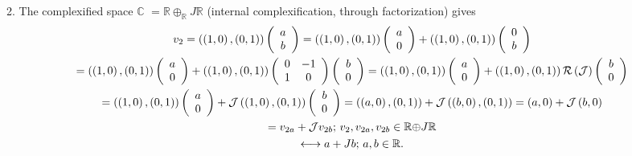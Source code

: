 \documentclass[aps,preprint]{revtex4}
\begin{document}
2. The complexified space $\mathbb{C}$ $=\mathbb{R}\oplus _{\mathbb{R}}J%
\mathbb{R}$ (internal complexification, through factorization) gives%
\begin{gather}
v_{2}=\left( \left( 1,0\right) ,\left( 0,1\right) \right) \left( 
\begin{array}{c}
a \\ 
b%
\end{array}%
\right) =\left( \left( 1,0\right) ,\left( 0,1\right) \right) \left( 
\begin{array}{c}
a \\ 
0%
\end{array}%
\right) +\left( \left( 1,0\right) ,\left( 0,1\right) \right) \left( 
\begin{array}{c}
0 \\ 
b%
\end{array}%
\right) \\
=\left( \left( 1,0\right) ,\left( 0,1\right) \right) \left( 
\begin{array}{c}
a \\ 
0%
\end{array}%
\right) +\left( \left( 1,0\right) ,\left( 0,1\right) \right) \left( 
\begin{array}{cc}
0 & -1 \\ 
1 & 0%
\end{array}%
\right) \left( 
\begin{array}{c}
b \\ 
0%
\end{array}%
\right) =\left( \left( 1,0\right) ,\left( 0,1\right) \right) \left( 
\begin{array}{c}
a \\ 
0%
\end{array}%
\right) +\left( \left( 1,0\right) ,\left( 0,1\right) \right) \mathcal{R}%
\left( \mathcal{J}\right) \left( 
\begin{array}{c}
b \\ 
0%
\end{array}%
\right) \\
=\left( \left( 1,0\right) ,\left( 0,1\right) \right) \left( 
\begin{array}{c}
a \\ 
0%
\end{array}%
\right) +\mathcal{J}\left( \left( 1,0\right) ,\left( 0,1\right) \right)
\left( 
\begin{array}{c}
b \\ 
0%
\end{array}%
\right) =\left( \left( a,0\right) ,\left( 0,1\right) \right) +\mathcal{J}%
\left( \left( b,0\right) ,\left( 0,1\right) \right) =\left( a,0\right) +%
\mathcal{J}\left( b,0\right) \\
=v_{2a}+\mathcal{J}v_{2b};\,v_{2},v_{2a},v_{2b}\in \mathbb{R\oplus }J\mathbb{%
R} \\
\longleftrightarrow a+Jb;\,a,b\in \mathbb{R}.
\end{gather}%
\end{document}

